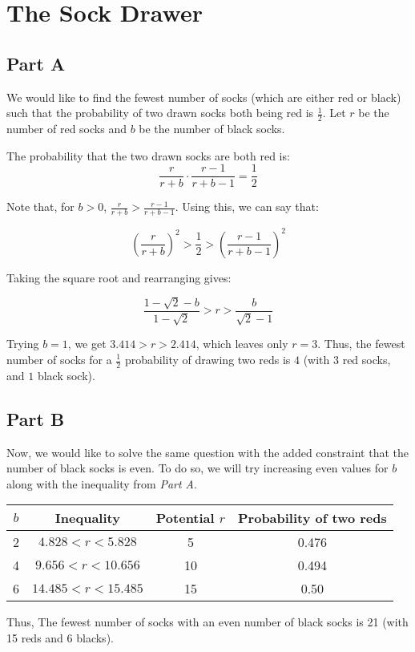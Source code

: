 \documentclass{article}
\date{}
\author{Kaan Aksoy | Feb 10, 2020}
\begin{document}
\maketitle

\section{The Sock Drawer}
\subsection{Part A}

We would like to find the fewest number of socks (which are either red or black) such that
the probability of two drawn socks both being red is $\frac{1}{2}$. 
Let $r$ be the number of red socks and $b$ be the number of 
black socks. 

The probability that the two drawn socks are both red is:
$$\frac{r}{r+b}\cdot\frac{r-1}{r+b-1} = \frac{1}{2}$$

Note that, for $b > 0$, $\frac{r}{r+b} > \frac{r-1}{r+b-1}$.
Using this, we can say that:

$$\left( \frac{r}{r+b} \right)^2 > \frac{1}{2} 
> \left( \frac{r-1}{r+b-1} \right)^2$$

Taking the square root and rearranging gives:
    
$$\frac{1-\sqrt{2}-b}{1-\sqrt{2}} > r > \frac{b}{\sqrt{2}-1}$$

Trying $b=1$, we get $3.414 > r > 2.414$, which leaves only 
$r=3$. Thus, the fewest number of socks for a $\frac{1}{2}$ 
probability of drawing two reds is $4$ 
(with $3$ red socks, and $1$ black sock).


\subsection{Part B}
Now, we would like to solve the same question with the added 
constraint that the number of black socks is even. To do so,
we will try increasing even values for $b$ along with the 
inequality from \textit{Part A}.

\begin{center}
\begin{tabular}{ |c|c|c|c| }
 \hline
 $b$ & Inequality & Potential $r$ & Probability of two reds \\ 
 \hline
 2 & $ 4.828 < r < 5.828 $ & 5 & 0.476 \\  
 4 & $ 9.656 < r < 10.656 $ & 10 & 0.494 \\
 6 & $ 14.485 < r < 15.485 $ & 15 & 0.50 \\
 \hline
\end{tabular}
\end{center}

Thus, The fewest number of socks with an even number of black 
socks is 21 (with 15 reds and 6 blacks).
\end{document}

